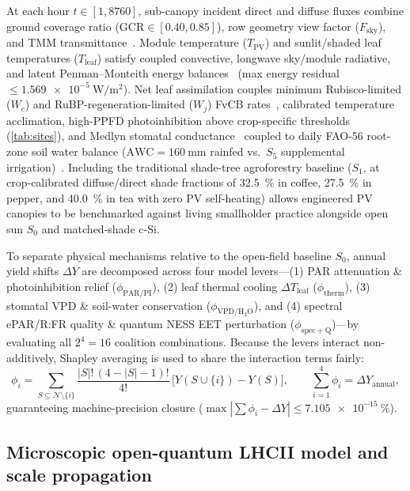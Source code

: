 \documentclass[preprint,12pt,a4paper]{elsarticle}
\begin{document}
At each hour $t \in [\num{1}, \num{8760}]$, sub-canopy incident direct and diffuse fluxes combine ground coverage ratio ($\mathrm{GCR}\in [\num{0.40}, \num{0.85}]$), row geometry view factor ($F_{\mathrm{sky}}$), and TMM transmittance~\cite{MaLu2022,Zainali2025}. Module temperature ($T_{\mathrm{PV}}$) and sunlit/shaded leaf temperatures ($T_{\mathrm{leaf}}$) satisfy coupled convective, longwave sky/module radiative, and latent Penman--Monteith energy balances~\cite{Allen1998,Marrou2013} (max energy residual $\le \qty{1.569e-5}{\watt\per\square\meter}$). Net leaf assimilation couples minimum Rubisco-limited ($W_c$) and RuBP-regeneration-limited ($W_j$) FvCB rates~\cite{Farquhar1980}, calibrated temperature acclimation, high-PPFD photoinhibition above crop-specific thresholds (\cref{tab:sites}), and Medlyn stomatal conductance~\cite{Medlyn2011} coupled to daily FAO-56 root-zone soil water balance ($\mathrm{AWC}=\qty{160}{\milli\meter}$ rainfed vs.\ $S_5$ supplemental irrigation)~\cite{Elamri2018}. Including the traditional shade-tree agroforestry baseline ($S_1$, at crop-calibrated diffuse/direct shade fractions of \qty{32.5}{\percent} in coffee, \qty{27.5}{\percent} in pepper, and \qty{40.0}{\percent} in tea with zero PV self-heating) allows engineered PV canopies to be benchmarked against living smallholder practice alongside open sun $S_0$ and matched-shade c-Si.

To separate physical mechanisms relative to the open-field baseline $S_0$, annual yield shifts $\Delta Y$ are decomposed across four model levers---(1) PAR attenuation \& photoinhibition relief ($\phi_{\mathrm{PAR/PI}}$), (2) leaf thermal cooling $\Delta T_{\mathrm{leaf}}$ ($\phi_{\mathrm{therm}}$), (3) stomatal VPD \& soil-water conservation ($\phi_{\mathrm{VPD/H_2O}}$), and (4) spectral ePAR/R:FR quality \& quantum NESS EET perturbation ($\phi_{\mathrm{spec+Q}}$)---by evaluating all $2^4 = \num{16}$ coalition combinations. Because the levers interact non-additively, Shapley averaging is used to share the interaction terms fairly:
\begin{equation}
 \phi_i = \sum_{S \subseteq \mathcal{N}\setminus \{i\}} \frac{|S|!\,(4-|S|-1)!}{4!}\,\Big[Y(S\cup\{i\}) - Y(S)\Big], \qquad \sum_{i=1}^4 \phi_i = \Delta Y_{\mathrm{annual}},
 \label{eq:shapley}
\end{equation}
guaranteeing machine-precision closure ($\max |\sum \phi_i - \Delta Y| \le \qty{7.105e-15}{\percent}$).

\subsection{Microscopic open-quantum LHCII model and scale propagation}
\label{sec:methods_quantum}
\end{document}
